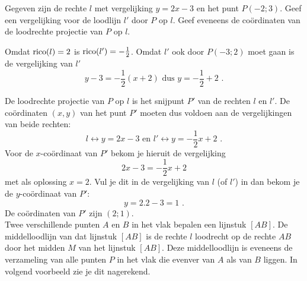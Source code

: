 \begin{voorbeeld}
	Gegeven zijn de rechte $l$ met vergelijking $y=2x-3$ en het punt $P(-2;3)$.
Geef een vergelijking voor de loodlijn $l'$ door $P$ op $l$.
Geef eveneens de co\"ordinaten van de loodrechte projectie van $P$ op $l$.

\begin{center}
	
\end{center}



Omdat $\operatorname{rico} (l)=2$ is $\operatorname{rico} (l')=-\frac{1}{2}$.
Omdat $l'$ ook door $P(-3;2)$ moet gaan is de vergelijking van $l'$
\[
y-3=-\frac{1}{2}(x+2) \text { dus } y=-\frac{1}{2}+2 \text { .}
\]

De loodrechte projectie van $P$ op $l$ is het snijpunt $P'$ van de rechten $l$ en $l'$.
De co\"ordinaten $(x,y)$ van het punt $P'$ moeten dus voldoen aan de vergelijkingen van beide rechten:
\[
l \leftrightarrow y=2x-3 \text { en } l' \leftrightarrow y=-\frac{1}{2}x+2 \text { .}
\]
Voor de $x$-co\"ordinaat van $P'$ bekom je hieruit de vergelijking
\[
2x-3=-\frac{1}{2}x+2
\]
met als oplossing $x=2$.
Vul je dit in de vergelijking van $l$ (of $l'$) in dan bekom je de $y$-co\"ordinaat van $P'$:
\[
y=2.2-3=1 \text { .}
\]
De co\"ordinaten van $P'$ zijn $(2;1)$.\\

Twee verschillende punten $A$ en $B$ in het vlak bepalen een lijnstuk $[AB]$.
De middelloodlijn van dat lijnstuk $[AB]$ is de rechte $l$ loodrecht op de rechte $AB$ door het midden $M$ van het lijnstuk $[AB]$.
Deze middelloodlijn is eveneens de verzameling van alle punten $P$ in het vlak die evenver van $A$ als van $B$ liggen.
In volgend voorbeeld zie je dit nagerekend.\\

\end{voorbeeld}

